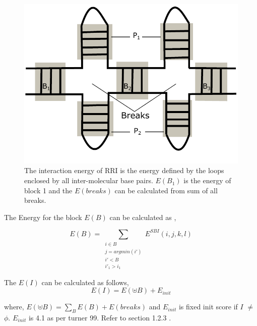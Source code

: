 \documentclass[twoside,a4paper]{report}
\numberwithin{equation}{section}
\begin{document}
	\begin{figure}[tb]
		\includegraphics[width=0.5\linewidth]{break.pdf}
		\centering
		\caption{The interaction energy of RRI is the energy defined by the loops enclosed by all inter-molecular base pairs. $E(B_1)$ is the energy of block 1 and the $E(breaks)$ can be calculated from sum of all breaks.  }
		\label{fig:break}
	\end{figure}

		
	 The Energy for the block $E(B)$ can be calculated as  ,
	
%	
%	
	
	
	\begin{equation}
	\label{eq:equ1}
	E(B) =  \sum_{\substack{i \in B \\  j = argmin(i') \\ i' < B \\ i'_1 > i_1 }}E^{SBI}(i,j,k,l)
	\end{equation}	
	
	
	
		The $E(I)$ can be calculated as follows,
		\begin{equation}
	\label{eq:equ2}
		E(I) = E(  \uplus  B) + E_{init} 	
	\end{equation}	
	
	\begin{center}
		where, $E(  \uplus  B) = \sum_B E(B) + E(breaks)$ and $E_{init}$ is fixed init score if $I$ $\neq$ $\phi$. $E_{init}$ is 4.1 as per turner 99. Refer to section 1.2.3 .
	\end{center}
\end{document}
